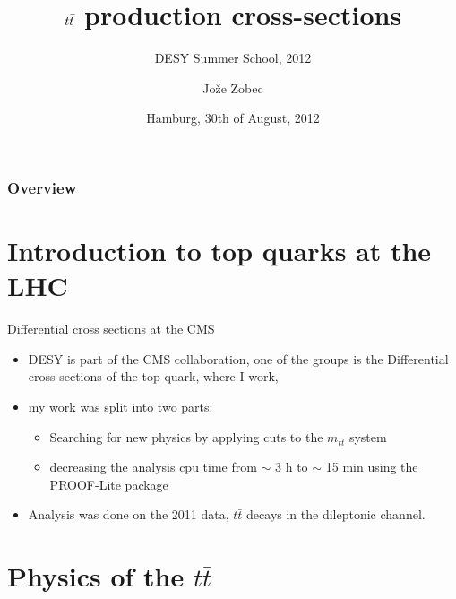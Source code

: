 \documentclass{beamer}
\title{$\ttbar$ production cross-sections}
\subtitle{DESY Summer School, 2012}
\author{Jože Zobec}
\date[\today]{Hamburg, 30th of August, 2012}
\institute[DESY, CMS]{Supervisor: Andreas Meyer}
\newcommand{\ttbar}{
	\ensuremath{t\bar{t}}
}
\begin{document}
\begin{frame}
	\titlepage
\end{frame}

\begin{frame}
	\frametitle{Overview}
	\tableofcontents
\end{frame}


\section{Introduction to top quarks at the LHC}
\begin{frame}[t]{Differential cross sections at the CMS}
	\begin{itemize}
		\item{DESY is part of the CMS collaboration, one of the groups is the Differential
			cross-sections of the top quark, where I work,}
		\item{my work was split into two parts:}
		\begin{itemize}
			\item{Searching for new physics by applying cuts to the $m_{\ttbar}$ system}
			\item{decreasing the analysis cpu time from $\sim$ 3 h to $\sim$ 15 min using
				the PROOF-Lite package}
		\end{itemize}
		\item{Analysis was done on the 2011 data, $\ttbar$ decays in the dileptonic channel.}
	\end{itemize}
\end{frame}

\section{Physics of the $\ttbar$}
\end{document}
